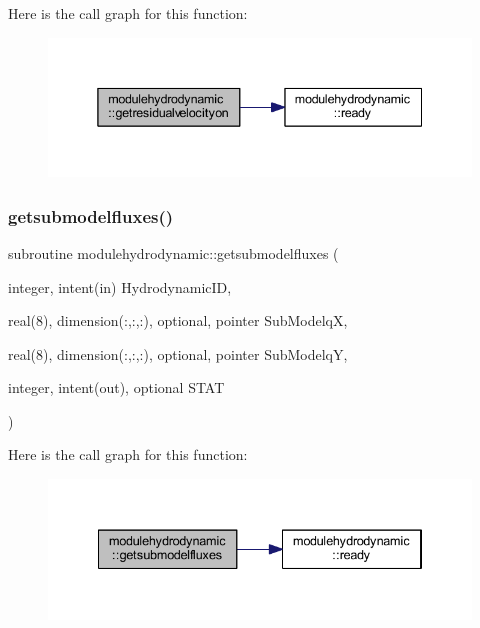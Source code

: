Here is the call graph for this function\+:\nopagebreak
\begin{figure}[H]
\begin{center}
\leavevmode
\includegraphics[width=338pt]{namespacemodulehydrodynamic_a987751c28d42e91f65901a19ca158b03_cgraph}
\end{center}
\end{figure}
\mbox{\label{namespacemodulehydrodynamic_a2b0f8d10e1768612e8bc67bcc2535ffe}} 
\subsubsection{\texorpdfstring{getsubmodelfluxes()}{getsubmodelfluxes()}}
{\footnotesize\ttfamily subroutine modulehydrodynamic\+::getsubmodelfluxes (\begin{DoxyParamCaption}\item[{integer, intent(in)}]{Hydrodynamic\+ID,  }\item[{real(8), dimension(\+:,\+:,\+:), optional, pointer}]{Sub\+ModelqX,  }\item[{real(8), dimension(\+:,\+:,\+:), optional, pointer}]{Sub\+ModelqY,  }\item[{integer, intent(out), optional}]{S\+T\+AT }\end{DoxyParamCaption})\hspace{0.3cm}{\ttfamily [private]}}

Here is the call graph for this function\+:\nopagebreak
\begin{figure}[H]
\begin{center}
\leavevmode
\includegraphics[width=334pt]{namespacemodulehydrodynamic_a2b0f8d10e1768612e8bc67bcc2535ffe_cgraph}
\end{center}
\end{figure}
\mbox{\label{namespacemodulehydrodynamic_a9b4a77f72b7a93ea81baa40e63f809a2}} 
